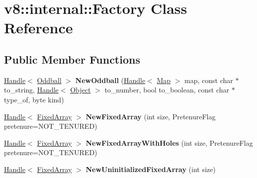 \hypertarget{classv8_1_1internal_1_1_factory}{}\section{v8\+:\+:internal\+:\+:Factory Class Reference}
\label{classv8_1_1internal_1_1_factory}
\subsection*{Public Member Functions}
\begin{DoxyCompactItemize}
\item 
\hyperlink{classv8_1_1internal_1_1_handle}{Handle}$<$ \hyperlink{classv8_1_1internal_1_1_oddball}{Oddball} $>$ {\bfseries New\+Oddball} (\hyperlink{classv8_1_1internal_1_1_handle}{Handle}$<$ \hyperlink{classv8_1_1internal_1_1_map}{Map} $>$ map, const char $\ast$to\+\_\+string, \hyperlink{classv8_1_1internal_1_1_handle}{Handle}$<$ \hyperlink{classv8_1_1internal_1_1_object}{Object} $>$ to\+\_\+number, bool to\+\_\+boolean, const char $\ast$type\+\_\+of, byte kind)\hypertarget{classv8_1_1internal_1_1_factory_aa0a7e352d720003b43ccb18d72a78d28}{}\label{classv8_1_1internal_1_1_factory_aa0a7e352d720003b43ccb18d72a78d28}

\item 
\hyperlink{classv8_1_1internal_1_1_handle}{Handle}$<$ \hyperlink{classv8_1_1internal_1_1_fixed_array}{Fixed\+Array} $>$ {\bfseries New\+Fixed\+Array} (int size, Pretenure\+Flag pretenure=N\+O\+T\+\_\+\+T\+E\+N\+U\+R\+ED)\hypertarget{classv8_1_1internal_1_1_factory_a05f3befb2b7e81a4043a5600d4d3e371}{}\label{classv8_1_1internal_1_1_factory_a05f3befb2b7e81a4043a5600d4d3e371}

\item 
\hyperlink{classv8_1_1internal_1_1_handle}{Handle}$<$ \hyperlink{classv8_1_1internal_1_1_fixed_array}{Fixed\+Array} $>$ {\bfseries New\+Fixed\+Array\+With\+Holes} (int size, Pretenure\+Flag pretenure=N\+O\+T\+\_\+\+T\+E\+N\+U\+R\+ED)\hypertarget{classv8_1_1internal_1_1_factory_a0e7cc32a0cc3d2a88d39671d22dc1d0e}{}\label{classv8_1_1internal_1_1_factory_a0e7cc32a0cc3d2a88d39671d22dc1d0e}

\item 
\hyperlink{classv8_1_1internal_1_1_handle}{Handle}$<$ \hyperlink{classv8_1_1internal_1_1_fixed_array}{Fixed\+Array} $>$ {\bfseries New\+Uninitialized\+Fixed\+Array} (int size)\hypertarget{classv8_1_1internal_1_1_factory_a9c3432753b7b698e5745f1d557ec92cf}{}\label{classv8_1_1internal_1_1_factory_a9c3432753b7b698e5745f1d557ec92cf}


\end{DoxyCompactItemize}
